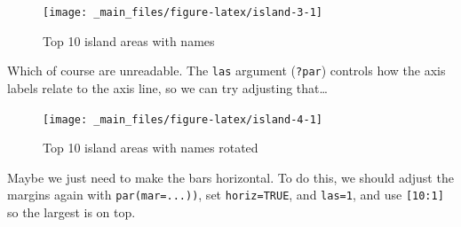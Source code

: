\documentclass[
  11pt,
  a4paper,
]{book}
\newenvironment{Shaded}{\begin{snugshade}}{\end{snugshade}}
\newcommand{\AttributeTok}[1]{\textcolor[rgb]{0.77,0.63,0.00}{#1}}
\newcommand{\ConstantTok}[1]{\textcolor[rgb]{0.00,0.00,0.00}{#1}}
\newcommand{\DecValTok}[1]{\textcolor[rgb]{0.00,0.00,0.81}{#1}}
\newcommand{\FunctionTok}[1]{\textcolor[rgb]{0.00,0.00,0.00}{#1}}
\newcommand{\NormalTok}[1]{#1}
\newcommand{\SpecialCharTok}[1]{\textcolor[rgb]{0.00,0.00,0.00}{#1}}
\newcommand{\StringTok}[1]{\textcolor[rgb]{0.31,0.60,0.02}{#1}}
\begin{document}
\begin{figure}

{\centering \texttt{[image: \_main\_files/figure-latex/island-3-1]} 

}

\caption{Top 10 island areas with names}\label{fig:island-3}
\end{figure}

Which of course are unreadable. The \texttt{las} argument (\texttt{?par}) controls how the axis labels relate to the axis line, so we can try adjusting that\ldots{}

\begin{Shaded}
\end{Shaded}

\begin{figure}

{\centering \texttt{[image: \_main\_files/figure-latex/island-4-1]} 

}

\caption{Top 10 island areas with names rotated}\label{fig:island-4}
\end{figure}

Maybe we just need to make the bars horizontal. To do this, we should adjust the margins again with \texttt{par(mar=...))}, set \texttt{horiz=TRUE}, and \texttt{las=1}, and use \texttt{{[}10:1{]}} so the largest is on top.

\begin{Shaded}
\end{Shaded}
\end{document}

